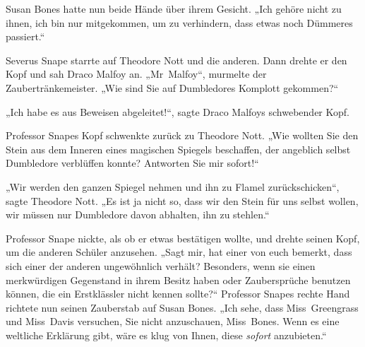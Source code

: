Susan Bones hatte nun beide Hände über ihrem Gesicht. „Ich gehöre nicht zu ihnen, ich bin nur mitgekommen, um zu verhindern, dass etwas noch Dümmeres passiert.“

Severus Snape starrte auf Theodore Nott und die anderen. Dann drehte er den Kopf und sah Draco Malfoy an. „Mr~Malfoy“, murmelte der Zaubertränkemeister.
„Wie sind Sie auf Dumbledores Komplott gekommen?“

„Ich habe es aus Beweisen abgeleitet!“, sagte Draco Malfoys schwebender Kopf.

Professor Snapes Kopf schwenkte zurück zu Theodore Nott.
„Wie wollten Sie den Stein aus dem Inneren eines magischen Spiegels beschaffen, der angeblich selbst Dumbledore verblüffen konnte? Antworten Sie mir sofort!“

„Wir werden den ganzen Spiegel nehmen und ihn zu Flamel zurückschicken“, sagte Theodore Nott. „Es ist ja nicht so, dass wir den Stein für uns selbst wollen, wir müssen nur Dumbledore davon abhalten, ihn zu stehlen.“

Professor Snape nickte, als ob er etwas bestätigen wollte, und drehte seinen Kopf, um die anderen Schüler anzusehen.
„Sagt mir, hat einer von euch bemerkt, dass sich einer der anderen ungewöhnlich verhält? Besonders, wenn sie einen merkwürdigen Gegenstand in ihrem Besitz haben oder Zaubersprüche benutzen können, die ein Erstklässler nicht kennen sollte?“
Professor Snapes rechte Hand richtete nun seinen Zauberstab auf Susan Bones.
„Ich sehe, dass Miss~Greengrass und Miss~Davis versuchen, Sie nicht anzuschauen, Miss~Bones. Wenn es eine weltliche Erklärung gibt, wäre es klug von Ihnen, diese \emph{sofort} anzubieten.“

